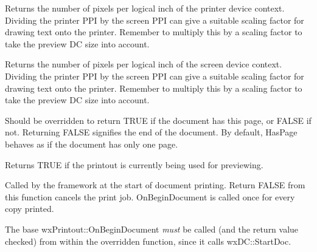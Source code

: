 
\label{wxprintoutgetppiprinter}


Returns the number of pixels per logical inch of the printer device context.
Dividing the printer PPI by the screen PPI can give a suitable scaling
factor for drawing text onto the printer. Remember to multiply
this by a scaling factor to take the preview DC size into account.


\label{wxprintoutgetppiscreen}


Returns the number of pixels per logical inch of the screen device context.
Dividing the printer PPI by the screen PPI can give a suitable scaling
factor for drawing text onto the printer. Remember to multiply
this by a scaling factor to take the preview DC size into account.


\label{wxprintouthaspage}


Should be overridden to return TRUE if the document has this page, or FALSE
if not. Returning FALSE signifies the end of the document. By default,
HasPage behaves as if the document has only one page.

\label{wxprintoutispreview}


Returns TRUE if the printout is currently being used for previewing.

\label{wxprintoutonbegindocument}


Called by the framework at the start of document printing. Return FALSE from
this function cancels the print job. OnBeginDocument is called once for every
copy printed.

The base wxPrintout::OnBeginDocument {\it must} be called (and the return value
checked) from within the overridden function, since it calls wxDC::StartDoc.

